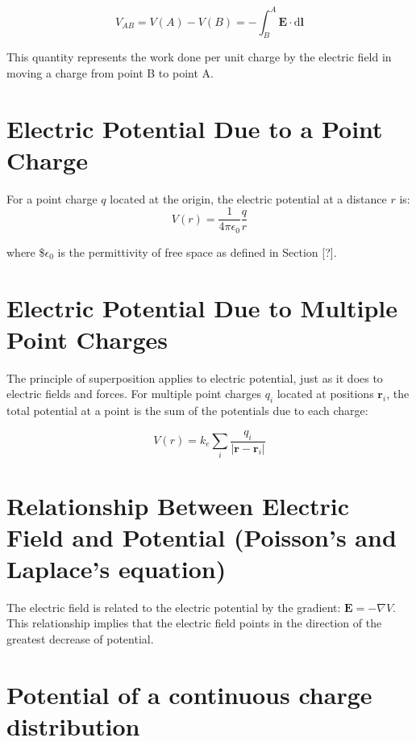 \documentclass[
  letterpaper,
  DIV=11,
  numbers=noendperiod]{scrreprt}
\begin{document}
\[ V_{AB} = V(A) − V(B) = -\int_{B}^{A} \mathrm{\mathbf{E}}\cdot \mathrm{d} \mathrm{\mathbf{l}}\]

This quantity represents the work done per unit charge by the electric
field in moving a charge from point B to point A.

\section{Electric Potential Due to a Point
Charge}\label{electric-potential-due-to-a-point-charge}

For a point charge \(q\) located at the origin, the electric potential
at a distance \(r\) is:
\[ V(r) = \frac{1}{4\pi\epsilon_0} \frac{q}{r} \]

where \$\(\epsilon_0\) is the permittivity of free space as defined in
Section {[}?{]}.

\section{Electric Potential Due to Multiple Point
Charges}\label{electric-potential-due-to-multiple-point-charges}

The principle of superposition applies to electric potential, just as it
does to electric fields and forces. For multiple point charges \(q_i\)
located at positions \(\mathrm{\mathbf{r}}_i\), the total potential at a
point is the sum of the potentials due to each
charge:

\[ V(r) = k_e \sum_{i} \frac{q_i}{|\mathrm{\mathbf{r}}- \mathrm{\mathbf{r}}_i|} \]

\section{Relationship Between Electric Field and Potential (Poisson's
and Laplace's
equation)}\label{relationship-between-electric-field-and-potential-poissons-and-laplaces-equation}

The electric field is related to the electric potential by the gradient:
\(\mathrm{\mathbf{E}}= -\nabla V\). This relationship implies that the
electric field points in the direction of the greatest decrease of
potential.

\section{Potential of a continuous charge
distribution}\label{potential-of-a-continuous-charge-distribution}
\end{document}
